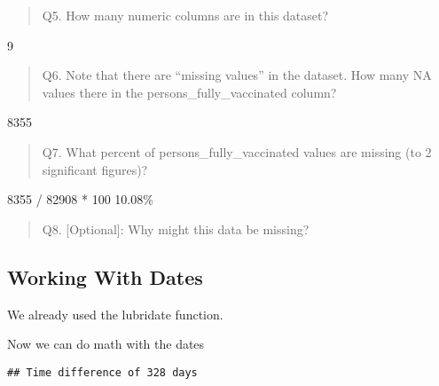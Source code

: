 \documentclass[
]{article}
\newenvironment{Shaded}{\begin{snugshade}}{\end{snugshade}}
\newcommand{\CommentTok}[1]{\textcolor[rgb]{0.56,0.35,0.01}{\textit{#1}}}
\newcommand{\DecValTok}[1]{\textcolor[rgb]{0.00,0.00,0.81}{#1}}
\newcommand{\FunctionTok}[1]{\textcolor[rgb]{0.00,0.00,0.00}{#1}}
\newcommand{\NormalTok}[1]{#1}
\newcommand{\OtherTok}[1]{\textcolor[rgb]{0.56,0.35,0.01}{#1}}
\newcommand{\SpecialCharTok}[1]{\textcolor[rgb]{0.00,0.00,0.00}{#1}}
\begin{document}
\begin{quote}
Q5. How many numeric columns are in this dataset?
\end{quote}

9

\begin{quote}
Q6. Note that there are ``missing values'' in the dataset. How many NA
values there in the persons\_fully\_vaccinated column?
\end{quote}

8355

\begin{quote}
Q7. What percent of persons\_fully\_vaccinated values are missing (to 2
significant figures)?
\end{quote}

8355 / 82908 * 100 10.08\%

\begin{quote}
Q8. {[}Optional{]}: Why might this data be missing?
\end{quote}

\hypertarget{working-with-dates}{%
\subsection{Working With Dates}\label{working-with-dates}}

We already used the lubridate function.

\begin{Shaded}
\end{Shaded}

Now we can do math with the dates

\begin{Shaded}
\end{Shaded}

\begin{verbatim}
## Time difference of 328 days
\end{verbatim}
\end{document}
